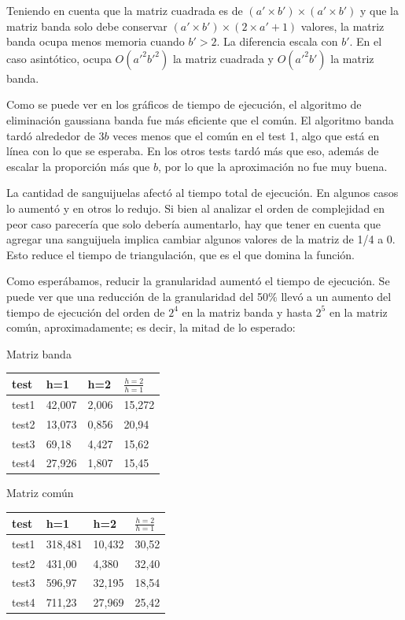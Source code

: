 \documentclass[a4paper]{article}
\begin{document}

Teniendo en cuenta que la matriz cuadrada es de $(a' \times b') \times (a' \times b')$ y que la matriz banda solo debe conservar $(a' \times b') \times (2 \times a' + 1)$ valores, la matriz banda ocupa menos memoria cuando $b' > 2$. La diferencia escala con $b'$. En el caso asintótico, ocupa $O(a'^2 b'^2)$ la matriz cuadrada y $O(a'^2 b')$ la matriz banda.

Como se puede ver en los gráficos de tiempo de ejecución, el algoritmo de eliminación gaussiana banda fue más eficiente que el común. El algoritmo banda tardó alrededor de $3b$ veces menos que el común en el test 1, algo que está en línea con lo que se esperaba. En los otros tests tardó más que eso, además de escalar la proporción más que $b$, por lo que la aproximación no fue muy buena.

La cantidad de sanguijuelas afectó al tiempo total de ejecución. En algunos casos lo aumentó y en otros lo redujo. Si bien al analizar el orden de complejidad en peor caso parecería que solo debería aumentarlo, hay que tener en cuenta que agregar una sanguijuela implica cambiar algunos valores de la matriz de 1/4 a 0. Esto reduce el tiempo de triangulación, que es el que domina la función.

Como esperábamos, reducir la granularidad aumentó el tiempo de ejecución. Se puede ver que una reducción de la granularidad del 50$\%$ llevó a un aumento del tiempo de ejecución del orden de $2^4$ en la matriz banda y hasta $2^5$ en la matriz común, aproximadamente; es decir, la mitad de lo esperado:\newline

Matriz banda \newline

\begin{tabular}{ l|l l l}
  test & h=1 & h=2 & $\frac{h=2}{h=1}$ \\
  \hline
  test1 & 42,007 & 2,006 & 15,272 \\
  test2 & 13,073 & 0,856 & 20,94 \\
  test3 & 69,18 & 4,427 & 15,62 \\
  test4 & 27,926 & 1,807 & 15,45 \\
\end{tabular} \newline \newline

Matriz común \newline

\begin{tabular}{ l|l l l}
  test & h=1 & h=2 & $\frac{h=2}{h=1}$ \\
  \hline
  test1 & 318,481 & 10,432 & 30,52 \\
  test2 & 431,00 & 4,380 & 32,40 \\
  test3 & 596,97 & 32,195 & 18,54 \\
  test4 & 711,23 & 27,969 & 25,42 \\
\end{tabular} \newline \newline
\end{document}
